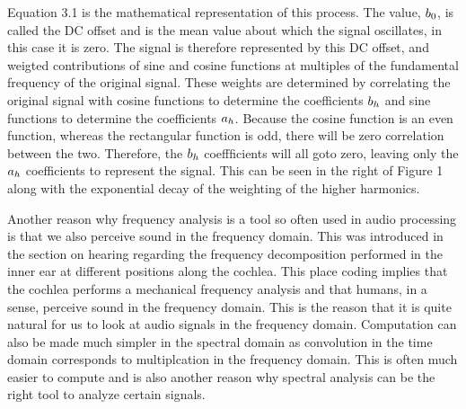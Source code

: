 Equation 3.1 is the mathematical representation of this process. The value, \begin{math}b_0\end{math}, is called the DC offset and is the mean value about which the signal oscillates, in this case it is zero. The signal is therefore represented by this DC offset, and weigted contributions of sine and cosine functions at multiples of the fundamental frequency of the original signal. These weights are determined by correlating the original signal with cosine functions to determine the coefficients  \begin{math}b_h\end{math} and sine functions to determine the coefficients \begin{math}a_h\end{math}. Because the cosine function is an even function, whereas the rectangular function is odd, there will be zero correlation between the two. Therefore, the \begin{math}b_h\end{math} coeffficients will all goto zero, leaving only the \begin{math}a_h\end{math} coefficients to represent the signal. This can be seen in the right of Figure 1 along with the exponential decay of the weighting of the higher harmonics. \\

  


Another reason why frequency analysis is a tool so often used in audio processing is that we also perceive sound in the frequency domain. This was introduced in the section on hearing regarding the frequency decomposition performed in the inner ear at different positions along the cochlea. This place coding implies that the cochlea performs a mechanical frequency analysis and that humans, in a sense, perceive sound in the frequency domain. This is the reason that it is quite natural for us to look at audio signals in the frequency domain. Computation can also be made much simpler in the spectral domain as convolution in the time domain corresponds to multiplcation in the frequency domain. This is often much easier to compute and is also another reason why spectral analysis can be the right tool to analyze certain signals.\\
  
